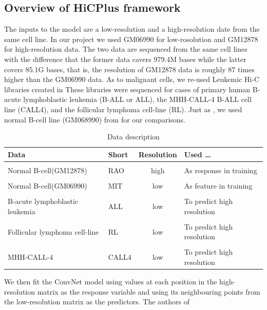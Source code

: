 \documentclass{article}
\begin{document}
\subsection{Overview of HiCPlus framework}
The inputs to the model are a low-resolution
and a high-resolution date from the same
cell line. In our project we used GM06990
for low-rosolution and GM12878 for
high-resolution data. The two data are
sequenced from the same cell lines with
the difference that the former data
cavers 979.4M bases while the latter
covers 85.1G bases, that is, the resolution
of GM12878 data is roughly 87 times higher
than the GM06990 data.
As to malignant cells,
we re-used Leukemic Hi-C libraries 
created in \cite{wang2013properties}
These libraries were sequenced 
for cases of primary human B-acute
lymphoblastic leukemia (B-ALL or ALL), 
the MHH-CALL-4 B-ALL cell
line (CALL4), 
and the follicular lymphoma cell-line (RL).
Just as \cite{wang2013properties}, 
we used normal B-cell line (GM068990)
from \cite{lieberman2009comprehensive} 
for our comparisons.
\begin{table}[]
    \centering
    \begin{tabular}{llcl}
        Data                           & Short & Resolution & Used …                     \\ \hline\hline\\
        Normal B-cell(GM12878)         & RAO   & high       & As response in training    \\[5pt]\\
        Normal B-cell(GM06990)         & MIT   & low        & As feature in training     \\[5pt]\\
        B-acute lymphoblastic leukemia & ALL   & low        & To predict high resolution \\[5pt]\\
        Follicular lymphoma cell-line  & RL    & low        & To predict high resolution \\[5pt]\\
        MHH-CALL-4                     & CALL4 & low        & To predict high resolution \\[10pt]
    \end{tabular}
    \caption{Data description}
    \label{tab:data}
\end{table}
We then fit the ConvNet model using values at 
each position in the high-resolution matrix as 
the response variable and using its 
neighbouring points from the 
low-resolution matrix as the predictors.
The authors of \cite{zhang2018enhancing}
\end{document}
